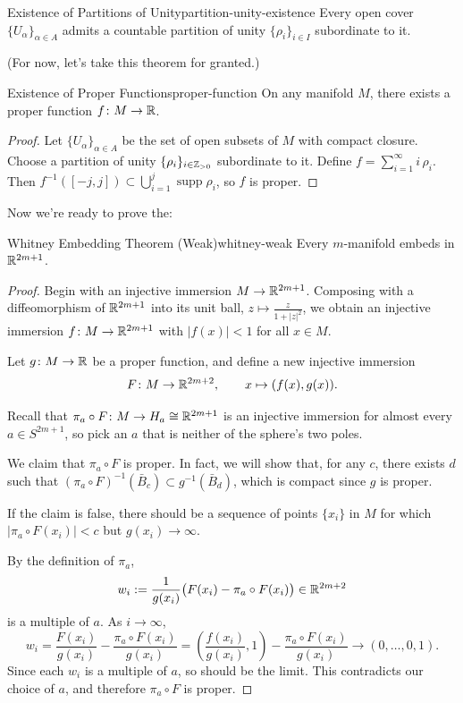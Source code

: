 \begin{theorem}{Existence of Partitions of Unity}{partition-unity-existence}
    Every open cover $\{U_\alpha\}_{\alpha \in A}$ admits a countable partition of unity $\{\rho_i\}_{i \in I}$ subordinate to it.
\end{theorem}

(For now, let's take this theorem for granted.)

\begin{corollary}{Existence of Proper Functions}{proper-function}
    On any manifold $M$, there exists a proper function $f \colon M \to \mathbb{R}$.
\end{corollary}

\begin{proof}
    Let $\{U_\alpha\}_{\alpha \in A}$ be the set of open subsets of $M$ with compact closure. Choose a partition of unity $\{\rho_i\}_{i \in \mathbb{Z}_{>0}}$ subordinate to it. Define $f = \sum_{i=1}^{\infty} i\,\rho_i$. Then $f^{-1}([-j, j]) \subset \bigcup_{i=1}^{j} \operatorname{supp} \rho_i$, so $f$ is proper.
\end{proof}

Now we're ready to prove the:

\begin{theorem}{Whitney Embedding Theorem (Weak)}{whitney-weak}
    Every $m$-manifold embeds in $\mathbb{R}^{2m+1}$.
\end{theorem}

\begin{proof}
    Begin with an injective immersion $M \to \mathbb{R}^{2m+1}$. Composing with a diffeomorphism of $\mathbb{R}^{2m+1}$ into its unit ball, $z \mapsto \frac{z}{1 + |z|^2}$, we obtain an injective immersion $f \colon M \to \mathbb{R}^{2m+1}$ with $|f(x)| < 1$ for all $x \in M$.

    Let $g \colon M \to \mathbb{R}$ be a proper function, and define a new injective immersion
    \[
        F \colon M \to \mathbb{R}^{2m+2}, \qquad x \mapsto (f(x), g(x)).
    \]

    Recall that $\pi_a \circ F \colon M \to H_a \cong \mathbb{R}^{2m+1}$ is an injective immersion for almost every $a \in S^{2m+1}$, so pick an $a$ that is neither of the sphere's two poles.

    We claim that $\pi_a \circ F$ is proper. In fact, we will show that, for any $c$, there exists $d$ such that $(\pi_a \circ F)^{-1}(\bar{B}_c) \subset g^{-1}(\bar{B}_d)$, which is compact since $g$ is proper.

    If the claim is false, there should be a sequence of points $\{x_i\}$ in $M$ for which $|\pi_a \circ F(x_i)| < c$ but $g(x_i) \to \infty$.

    By the definition of $\pi_a$,
    \[
        w_i := \frac{1}{g(x_i)}\bigl(F(x_i) - \pi_a \circ F(x_i)\bigr) \in \mathbb{R}^{2m+2}
    \]
    is a multiple of $a$. As $i \to \infty$,
    \[
        w_i = \frac{F(x_i)}{g(x_i)} - \frac{\pi_a \circ F(x_i)}{g(x_i)} = \left(\frac{f(x_i)}{g(x_i)}, 1\right) - \frac{\pi_a \circ F(x_i)}{g(x_i)} \to (0, \ldots, 0, 1).
    \]
    Since each $w_i$ is a multiple of $a$, so should be the limit. This contradicts our choice of $a$, and therefore $\pi_a \circ F$ is proper.
\end{proof}
